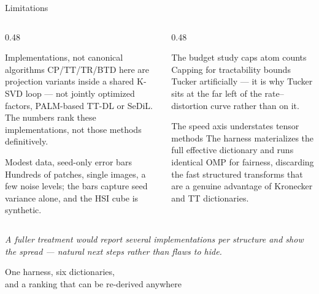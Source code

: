 \documentclass[aspectratio=169,9pt]{beamer}
\newcommand{\takeaway}[1]{\begin{center}\textit{\small #1}\end{center}}
\begin{document}
\begin{frame}{Limitations}
\begin{columns}[T,onlytextwidth]
\begin{column}{0.48\textwidth}
\begin{block}{Implementations, not canonical algorithms}
\scriptsize CP/TT/TR/BTD here are projection variants inside a shared K-SVD loop
--- not jointly optimized factors, PALM-based TT-DL or SeDiL. The numbers rank
these implementations, not those methods definitively.
\end{block}
\begin{block}{Modest data, seed-only error bars}
\scriptsize Hundreds of patches, single images, a few noise levels; the bars
capture seed variance alone, and the HSI cube is synthetic.
\end{block}
\end{column}
\begin{column}{0.48\textwidth}
\begin{block}{The budget study caps atom counts}
\scriptsize Capping for tractability bounds Tucker artificially --- it is why
Tucker sits at the far left of the rate--distortion curve rather than on it.
\end{block}
\begin{block}{The speed axis understates tensor methods}
\scriptsize The harness materializes the full effective dictionary and runs
identical OMP for fairness, discarding the fast structured transforms that are a
genuine advantage of Kronecker and TT dictionaries.
\end{block}
\end{column}
\end{columns}
\takeaway{A fuller treatment would report several implementations per structure
and show the spread --- natural next steps rather than flaws to hide.}
\end{frame}

\begin{frame}[standout]
One harness, six dictionaries,\\
and a ranking that can be re-derived anywhere
\end{frame}
\end{document}
